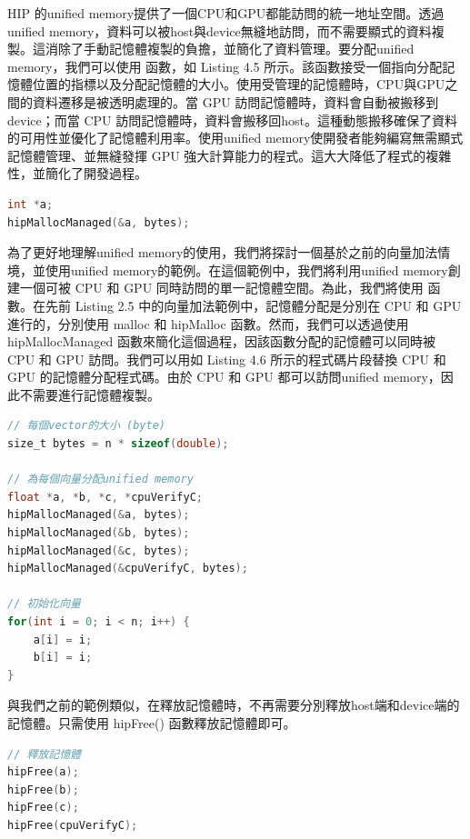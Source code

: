 HIP 的unified memory提供了一個CPU和GPU都能訪問的統一地址空間。透過unified memory，資料可以被host與device無縫地訪問，而不需要顯式的資料複製。這消除了手動記憶體複製的負擔，並簡化了資料管理。要分配unified memory，我們可以使用  函數，如 Listing 4.5 所示。該函數接受一個指向分配記憶體位置的指標以及分配記憶體的大小。使用受管理的記憶體時，CPU與GPU之間的資料遷移是被透明處理的。當 GPU 訪問記憶體時，資料會自動被搬移到device；而當 CPU 訪問記憶體時，資料會搬移回host。這種動態搬移確保了資料的可用性並優化了記憶體利用率。使用unified memory使開發者能夠編寫無需顯式記憶體管理、並無縫發揮 GPU 強大計算能力的程式。這大大降低了程式的複雜性，並簡化了開發過程。

\begin{lstlisting}[language=C, caption={在HIP中使用unified memory進行記憶體配置}, label={5th:example}]
int *a;
hipMallocManaged(&a, bytes);
\end{lstlisting}

為了更好地理解unified memory的使用，我們將探討一個基於之前的向量加法情境，並使用unified memory的範例。在這個範例中，我們將利用unified memory創建一個可被 CPU 和 GPU 同時訪問的單一記憶體空間。為此，我們將使用  函數。在先前 Listing 2.5 中的向量加法範例中，記憶體分配是分別在 CPU 和 GPU 進行的，分別使用 malloc 和 hipMalloc 函數。然而，我們可以透過使用 hipMallocManaged 函數來簡化這個過程，因該函數分配的記憶體可以同時被 CPU 和 GPU 訪問。我們可以用如 Listing 4.6 所示的程式碼片段替換 CPU 和 GPU 的記憶體分配程式碼。由於 CPU 和 GPU 都可以訪問unified memory，因此不需要進行記憶體複製。

\begin{lstlisting}[language=C, caption={在HIP中使用unified memory進行記憶體配置}, label={6th:example}]
// 每個vector的大小 (byte)
size_t bytes = n * sizeof(double);

// 為每個向量分配unified memory
float *a, *b, *c, *cpuVerifyC;
hipMallocManaged(&a, bytes);
hipMallocManaged(&b, bytes);
hipMallocManaged(&c, bytes);
hipMallocManaged(&cpuVerifyC, bytes);

// 初始化向量
for(int i = 0; i < n; i++) {
    a[i] = i;
    b[i] = i;
}
\end{lstlisting}

與我們之前的範例類似，在釋放記憶體時，不再需要分別釋放host端和device端的記憶體。只需使用 hipFree() 函數釋放記憶體即可。

\begin{lstlisting}[language=C, caption={釋放unified memory}, label={7th:example}]
// 釋放記憶體
hipFree(a);
hipFree(b);
hipFree(c);
hipFree(cpuVerifyC);
\end{lstlisting}

